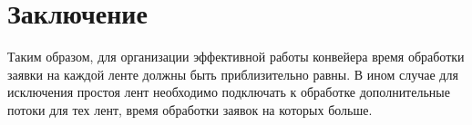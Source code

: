 \chapter*{Заключение}

Таким образом, для организации эффективной работы конвейера время обработки
заявки на каждой ленте должны быть приблизительно равны. В ином случае для
исключения простоя лент необходимо подключать к обработке дополнительные
потоки для тех лент, время обработки заявок на которых больше.
